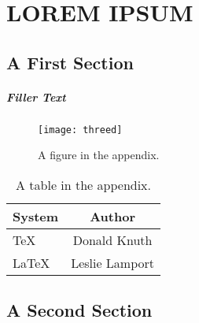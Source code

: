 \chapter{LOREM IPSUM}

\section{A First Section}

\paragraph{Filler Text} \lipsum[1-6]
%
\begin{figure}
  \centering
  \texttt{[image: threed]}%
  \caption{A figure in the appendix.}
  \label{fig:app}
\end{figure}
%
\lipsum[7-10]
\begin{table}
  \caption{A table in the appendix.}
  \label{tab:app}
  \begin{center}
    \begin{tabular}{lc}
      \toprule
      System & Author \\
      \midrule
      \TeX   & Donald Knuth   \\
      \LaTeX & Leslie Lamport \\
      \bottomrule
    \end{tabular}
  \end{center}
\end{table}
%

\section{A Second Section}

\lipsum[14-15]
